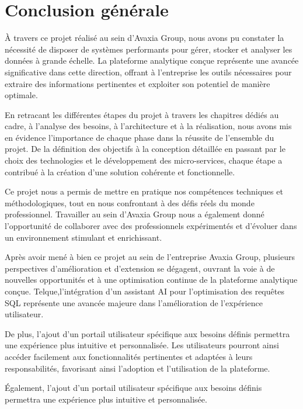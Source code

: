 \chapter*{Conclusion générale}

\par À travers ce projet réalisé au sein d'Avaxia Group, nous avons pu constater la nécessité de disposer de systèmes performants pour gérer, 
stocker et analyser les données à grande échelle. La plateforme analytique conçue représente une avancée significative dans cette direction, 
offrant à l'entreprise les outils nécessaires pour extraire des informations pertinentes et exploiter son potentiel de manière optimale.
\par En retracant les différentes étapes du projet à travers les chapitres dédiés au cadre, à l'analyse des besoins, à l'architecture et
 à la réalisation, nous avons mis en évidence l'importance de chaque phase dans la réussite de l'ensemble du projet. De la définition 
 des objectifs à la conception détaillée en passant par le choix des technologies et le développement des micro-services, chaque étape 
 a contribué à la création d'une solution cohérente et fonctionnelle.
 \par Ce projet nous a permis de mettre en pratique nos compétences techniques et méthodologiques, tout en nous confrontant à des défis
  réels du monde professionnel. Travailler au sein d'Avaxia Group nous a également donné l'opportunité de collaborer avec des professionnels
   expérimentés et d'évoluer dans un environnement stimulant et enrichissant.
\par Après avoir mené à bien ce projet au sein de l'entreprise Avaxia Group, plusieurs perspectives d'amélioration et d'extension se dégagent,
 ouvrant la voie à de nouvelles opportunités et à une optimisation continue de la plateforme analytique conçue. Telque,l'intégration d'un assistant AI 
 pour l'optimisation des requêtes SQL représente une avancée majeure dans l'amélioration de l'expérience utilisateur. 
 \par De plus, l'ajout d'un portail utilisateur spécifique aux besoins définis permettra une expérience plus intuitive et personnalisée. 
 Les utilisateurs pourront ainsi accéder facilement aux fonctionnalités pertinentes et adaptées à leurs responsabilités, favorisant ainsi 
 l'adoption et l'utilisation de la plateforme.
 \par Également, l'ajout d'un portail utilisateur spécifique aux besoins définis permettra une expérience plus intuitive et personnalisée.
